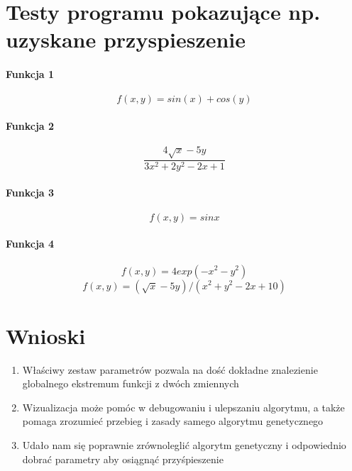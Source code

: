 \documentclass[a4paper, 12pt]{article}
\begin{document}
\section{Testy programu pokazujące np. uzyskane przyspieszenie}
\paragraph{Funkcja 1} \hfill \break
\[
f(x, y) = sin(x) + cos(y)
\]
\paragraph{Funkcja 2} \hfill \break
\[
    \frac{4 \sqrt{x} - 5y}{ 3x ^ 2 + 2 y ^ 2 - 2 x + 1}
\]
\paragraph{Funkcja 3} \hfill \break
\[
f(x, y) = sinx
\]

\paragraph{Funkcja 4}
\[
f(x, y) = 4exp(-x^2 - y^2)
\]
\[
f(x, y) = (\sqrt{x}- 5y ) / (x^2+ y^2  - 2x + 10)
\]

\section{Wnioski} 

\begin{enumerate}
    \item Właściwy zestaw parametrów pozwala na dość dokładne znalezienie globalnego ekstremum funkcji z dwóch zmiennych
    \item Wizualizacja może pomóc w debugowaniu i ulepszaniu algorytmu, a także pomaga zrozumieć przebieg i zasady samego algorytmu genetycznego
    \item Udało nam się poprawnie zrównoleglić algorytm genetyczny i odpowiednio dobrać
parametry aby osiągnąć przyśpieszenie
\end{enumerate}
\label{LastPage}~
\label{LastPageOfBackMatter}~		
\end{document}
